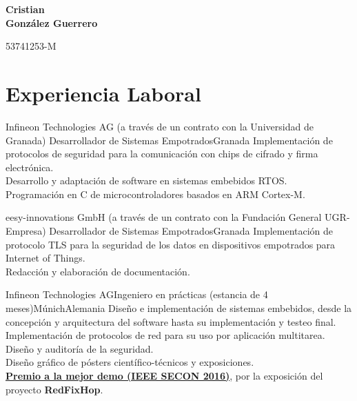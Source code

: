 \documentclass[11pt,a4paper,sans,spanish]{moderncv}
\begin{document}
\begin{minipage}[c]{\textwidth-110pt-0.2em}
    \begin{flushright}
        \textbf{\Huge{Cristian\\\vspace{4pt}González Guerrero}}

        \vspace{4pt}
        \small{53741253-M}
    \end{flushright}
\end{minipage}
\vspace{-5em}

\makecvtitle

\section{Experiencia Laboral}

{Infineon Technologies AG (a través de un contrato con la Universidad de Granada)}
{Desarrollador de Sistemas Empotrados}{Granada}{}
{Implementación de protocolos de seguridad para la comunicación con chips de cifrado y firma electrónica.\\
Desarrollo y adaptación de software en sistemas embebidos RTOS.\\
Programación en C de microcontroladores basados en ARM Cortex-M.\\
}

{eesy-innovations GmbH (a través de un contrato con la Fundación General UGR-Empresa)}
{Desarrollador de Sistemas Empotrados}{Granada}{}
{Implementación de protocolo TLS para la seguridad de los datos en dispositivos empotrados para Internet of Things.\\
Redacción y elaboración de documentación.\\
}

{Infineon Technologies AG}{Ingeniero en prácticas (estancia de 4 meses)}{Múnich}{Alemania}
{Diseño e implementación de sistemas embebidos, desde la concepción y arquitectura del software hasta su implementación y testeo final.\\
Implementación de protocolos de red para su uso por aplicación multitarea.\\
Diseño y auditoría de la seguridad.\\
Diseño gráfico de pósters científico-técnicos y exposiciones.\\
\href{http://secon2016.ieee-secon.org/content/demos-session}{\textbf{Premio a la mejor demo (IEEE SECON 2016)}}, por la exposición del proyecto \textbf{RedFixHop}.
}
\end{document}
